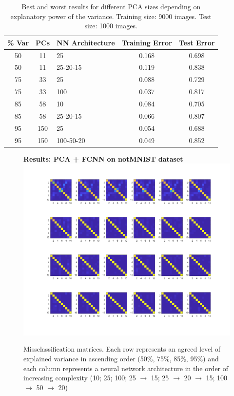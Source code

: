 \documentclass[letterpaper,12pt]{article}
\begin{document}
\begin{table}[p]
\centering
  \begin{tabular}{|cc|l|c|c|}
  	\hline
    \% Var & PCs & NN Architecture & Training Error & Test Error \\
    \hline
    \hline
    50 & 11 & 25 & 0.168   &  0.698 \\
    50 & 11 & 25-20-15 & 0.119  &   0.838  \\
    \hline
    75 & 33 & 25 & 0.088  &   0.729 \\
    75 & 33 & 100 &    0.037  &   0.817\\
    \hline
    85 & 58 & 10 & 0.084  &   0.705\\
    85 & 58 & 25-20-15 & 0.066  &   0.807\\
    \hline
    95 & 150 & 25 &  0.054   &  0.688\\
    95 & 150 & 100-50-20 & 0.049   &  0.852\\
    \hline
  \end{tabular}
  \vspace{0.5em}
  \caption{Best and worst results for different PCA sizes depending on explanatory power of the variance. Training size: 9000 images. Test size: 1000 images.}
\end{table}

\begin{figure}[p]
\centering
\textbf{Results: PCA + FCNN on notMNIST dataset}
  \includegraphics[width=0.9\linewidth]{PCA_1DNN_notMNIST}
\caption{Missclassification matrices. Each row represents an agreed level of explained variance in ascending order (50\%, 75\%, 85\%, 95\%) and each column represents a neural network architecture in the order of increasing complexity (10; 25; 100; 25 $\rightarrow$ 15; 25 $\rightarrow$ 20 $\rightarrow$ 15; 100 $\rightarrow$ 50 $\rightarrow$ 20)}
\label{fig:PCA_1DNN_notMNIST}
\end{figure}
\end{document}
